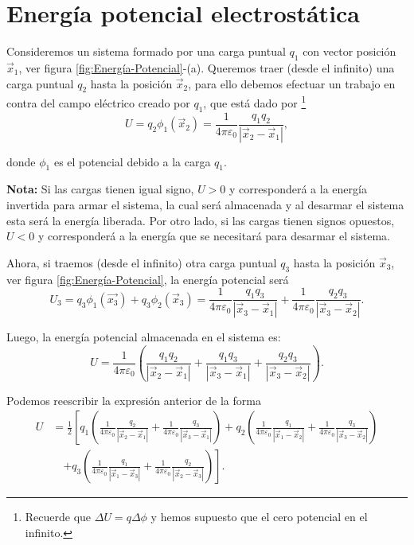 \section{Energía potencial electrostática}

Consideremos un sistema formado por una carga puntual $q_1$ con vector posición $\Vec{x}_1$, ver figura \ref{fig:Energía-Potencial}-(a). Queremos traer (desde el infinito) una carga puntual $q_2$ hasta la posición $\Vec{x}_2$, para ello debemos efectuar un trabajo en contra del campo eléctrico creado por $q_1$, que está dado por \footnote{Recuerde que $\Delta U = q \Delta \phi$ y hemos supuesto que el cero potencial en el infinito.}
$$U = q_2 \phi_1(\Vec{x}_2) = \frac{1}{4\pi\varepsilon_0}\frac{q_1 q_2}{|\Vec{x}_2 - \Vec{x}_1|},$$

donde $\phi_1$ es el potencial debido a la carga $q_1$.

\textbf{Nota:} Si las cargas tienen igual signo, $U > 0$ y corresponderá a la energía invertida para armar el sistema,  la cual será almacenada y al desarmar el sistema esta será la energía liberada. Por otro lado, si las cargas tienen signos opuestos, $U < 0$ y corresponderá a la energía que se necesitará para desarmar el sistema.

Ahora, si traemos (desde el infinito) otra carga puntual $q_3$ hasta la posición $\Vec{x}_3$, ver figura \ref{fig:Energía-Potencial}, la energía potencial será
$$U_3 = q_3 \phi_1(\vec{x_3}) + q_3 \phi_2(\Vec{x}_3) = \frac{1}{4\pi\varepsilon_0}\frac{q_1 q_3}{|\Vec{x}_3 - \Vec{x}_1|} + \frac{1}{4\pi\varepsilon_0}\frac{q_2 q_3}{|\Vec{x}_3 - \Vec{x}_2|}.$$

Luego, la energía potencial almacenada en el sistema es:
$$U = \frac{1}{4\pi \varepsilon_0} \left(\frac{q_1 q_2}{|\Vec{x}_2 - \Vec{x}_1|} + \frac{q_1q_3}{|\Vec{x}_3-\Vec{x}_1| } + \frac{q_2 q_3}{|\Vec{x}_3 - \Vec{x}_2|} \right).$$

Podemos reescribir la expresión anterior de la forma
\begin{align*}
    U &= \frac{1}{2} \left[q_1 \left( \frac{1}{4\pi \varepsilon_0} \frac{q_2}{|\Vec{x}_2-\Vec{x}_1|} + \frac{1}{4\pi \varepsilon_0} \frac{q_3}{|\Vec{x}_3-\Vec{x}_1|} \right) + q_2 \left( \frac{1}{4\pi \varepsilon_0} \frac{q_1}{|\Vec{x}_1-\Vec{x}_2|} + \frac{1}{4\pi \varepsilon_0} \frac{q_3}{|\Vec{x}_3-\Vec{x}_2|} \right) \right. \\
    &\quad \left. + q_3 \left( \frac{1}{4\pi \varepsilon_0} \frac{q_1}{|\Vec{x}_1-\Vec{x}_3|} + \frac{1}{4\pi \varepsilon_0} \frac{q_2}{|\Vec{x}_2-\Vec{x}_3|} \right) \right].
\end{align*}

